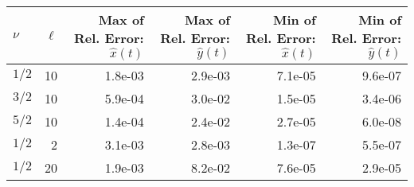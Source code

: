 \begin{tabular}{lrrrrr}
\toprule
$\nu$ & $\ell$ & Max of Rel. Error: $\hat{x}(t)$ & Max of Rel. Error: $\hat{y}(t)$ & Min of Rel. Error: $\hat{x}(t)$ & Min of Rel. Error: $\hat{y}(t)$ \\
\midrule
$1/2$ & 10 & 1.8e-03 & 2.9e-03 & 7.1e-05 & 9.6e-07 \\
$3/2$ & 10 & 5.9e-04 & 3.0e-02 & 1.5e-05 & 3.4e-06 \\
$5/2$ & 10 & 1.4e-04 & 2.4e-02 & 2.7e-05 & 6.0e-08 \\
$1/2$ & 2 & 3.1e-03 & 2.8e-03 & 1.3e-07 & 5.5e-07 \\
$1/2$ & 20 & 1.9e-03 & 8.2e-02 & 7.6e-05 & 2.9e-05 \\
\bottomrule
\end{tabular}
